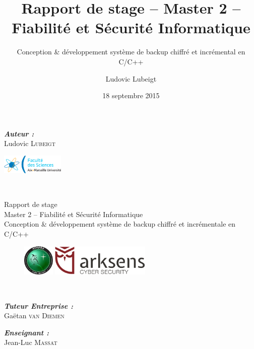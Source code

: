 \documentclass{beamer}
\title{Rapport de stage -- Master 2 -- Fiabilité et Sécurité Informatique}
\subtitle{Conception \&  d\'eveloppement syst\`eme de backup chiffr\'e et
incr\'emental en C/C++}
\author{Ludovic Lubeigt}
\institute{Aix-Marseille Universit\'e}
\date{18 septembre 2015}
\begin{document}
\begin{frame}
  \begin{minipage}{0.49\textwidth}
    \begin{flushleft}
      \emph{\bfseries Auteur :}\\
      Ludovic \textsc{Lubeigt}
    \end{flushleft}
  \end{minipage}
  \begin{minipage}{0.49\textwidth}
    \begin{flushright}
      \includegraphics[width=3cm]{logo_sciences.png}
    \end{flushright}
  \end{minipage}\\[2mm]

   
  \begin{beamerboxesrounded}[lower=arkblocklow, shadow=true]{}
    \centering\Large
    Rapport de stage\\ Master 2 -- Fiabilité et Sécurité Informatique\\
    Conception \& développement système de backup chiffré et incrémentale en
    C/C++
  \end{beamerboxesrounded}
  
  \begin{figure}[H]
    \begin{minipage}[t]{0.49\textwidth}
      \centering
      \includegraphics[height=1.5cm]{logo_adhara.png}
    \end{minipage}
    \begin{minipage}[t]{0.49\textwidth}
      \centering
      \includegraphics[height=1.5cm]{logo_arksens.png}
    \end{minipage}\\[0.15cm]
  \end{figure}
    
  \begin{minipage}{0.49\textwidth}
    \begin{flushleft}
      \emph{\bfseries Tuteur Entreprise :}\\
      Gaëtan \textsc{van Diemen}
    \end{flushleft}
  \end{minipage}
  \begin{minipage}{0.49\textwidth}
    \begin{flushright}
      \emph{\bfseries Enseignant :}\\
      Jean-Luc \textsc{Massat}
    \end{flushright}
  \end{minipage}\\[1mm]
  

\end{frame}
\end{document}
